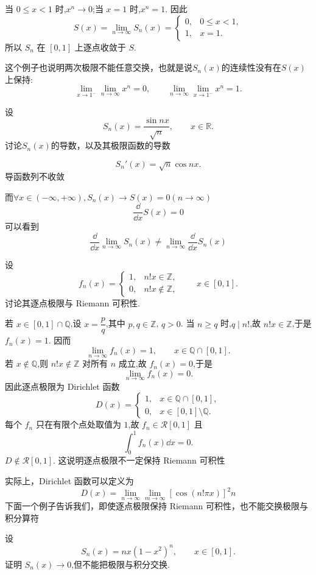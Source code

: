 \begin{solution}
	当 $0\leq x<1$ 时,$x^n\to0$;当 $x=1$ 时,$x^n=1$. 因此
	\[
	S(x)=\lim_{n\to\infty}S_n(x)=
	\begin{cases}
		0,&0\leq x<1,\\
		1,&x=1.
	\end{cases}
	\]
	所以 $S_n$ 在 $[0,1]$ 上逐点收敛于 $S$.
	
	这个例子也说明两次极限不能任意交换，也就是说$S_n(x)$的连续性没有在$S(x)$上保持:
	\[
	\lim_{x\to1^-}\lim_{n\to\infty}x^n=0,
	\qquad
	\lim_{n\to\infty}\lim_{x\to1^-}x^n=1.
	\]
\end{solution}
\begin{example}
	设
	\[
	S_n(x)=\frac{\sin nx}{\sqrt n},
	\qquad x\in\mathbb{R}.
	\]
	讨论$S_n(x)$的导数，以及其极限函数的导数
\end{example}
\begin{solution}
	\[
	S_n'(x)=\sqrt n\cos nx.
	\]
	导函数列不收敛 
	
	而$\forall x \in (-\infty,+\infty),S_n(x)\to S(x)=0 (n\to \infty)$
	\[\frac{\dd}{\dd x }S(x)= 0\]
	可以看到
	\[\frac{\dd}{\dd x }\lim\limits_{n\to\infty}S_n(x)\neq\lim\limits_{n\to\infty}\frac{\dd}{\dd x }S_n(x)\]
\end{solution}

\begin{problem}
	设
	\[
	f_n(x)=
	\begin{cases}
		1,& n!x\in\mathbb{Z},\\
		0,& n!x\notin\mathbb{Z},
	\end{cases}
	\qquad x\in[0,1].
	\]
	讨论其逐点极限与 Riemann 可积性.
\end{problem}

\begin{solution}
	若 $x\in[0,1]\cap\mathbb{Q}$,设 $x=\dfrac pq$,其中 $p,q\in\mathbb{Z}$, $q>0$. 当 $n\geq q$ 时,$q\mid n!$,故 $n!x\in\mathbb{Z}$,于是 $f_n(x)=1$. 因而
	\[
	\lim_{n\to\infty}f_n(x)=1,
	\qquad x\in\mathbb{Q}\cap[0,1].
	\]
	若 $x\notin\mathbb{Q}$,则 $n!x\notin\mathbb{Z}$ 对所有 $n$ 成立,故 $f_n(x)=0$,于是
	\[
	\lim_{n\to\infty}f_n(x)=0.
	\]
	因此逐点极限为 Dirichlet 函数
	\[
	D(x)=
	\begin{cases}
		1,&x\in\mathbb{Q}\cap[0,1],\\
		0,&x\in[0,1]\setminus\mathbb{Q}.
	\end{cases}
	\]
	每个 $f_n$ 只在有限个点处取值为 $1$,故 $f_n\in \mathcal{R}[0,1]$ 且
	\[
	\int_0^1 f_n(x)\dd x=0.
	\]
	 $D \notin \mathcal{R}[0,1]$. 这说明逐点极限不一定保持 Riemann 可积性
\end{solution}
实际上，Dirichlet 函数可以定义为
\[D(x)= \lim_{n \to \infty} \lim_{m \to \infty}[\cos(n!\pi x)]^2n\]
下面一个例子告诉我们，即使逐点极限保持 Riemann 可积性，也不能交换极限与积分算符
\begin{example}
		设
	\[
	S_n(x)=nx(1-x^2)^n,
	\qquad x\in[0,1].
	\]
	证明 $S_n(x)\to0$,但不能把极限与积分交换.
\end{example}


